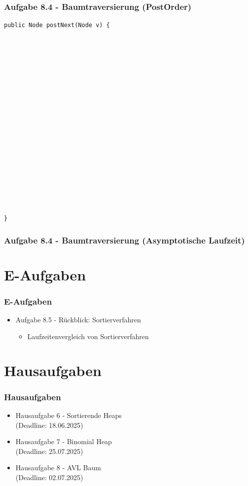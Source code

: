 \documentclass{beamer}
\begin{document}
\begin{frame}[fragile]
	\frametitle{Aufgabe 8.4 - Baumtraversierung (PostOrder)}
	\scriptsize
	\begin{verbatim}
public Node postNext(Node v) {



















}
	\end{verbatim}
\end{frame}

\begin{frame}[t]
	\frametitle{Aufgabe 8.4 - Baumtraversierung (Asymptotische Laufzeit)}
\end{frame}

\section{E-Aufgaben}
\begin{frame}
	\frametitle{E-Aufgaben}
	\begin{itemize}
		\item Aufgabe 8.5 - Rückblick: Sortierverfahren \\
		      \begin{itemize}
			      \item Laufzeitenvergleich von Sortierverfahren
		      \end{itemize}
	\end{itemize}
\end{frame}

\section{Hausaufgaben}
\begin{frame}
	\frametitle{Hausaufgaben}
	\begin{itemize}
		\item Hausaufgabe 6 - Sortierende Heaps \\
		      (Deadline: 18.06.2025)
		\item Hausaufgabe 7 - Binomial Heap \\
		      (Deadline: 25.07.2025)
		\item Hausaufgabe 8 - AVL Baum \\
		      (Deadline: 02.07.2025)
	\end{itemize}
\end{frame}
\end{document}
